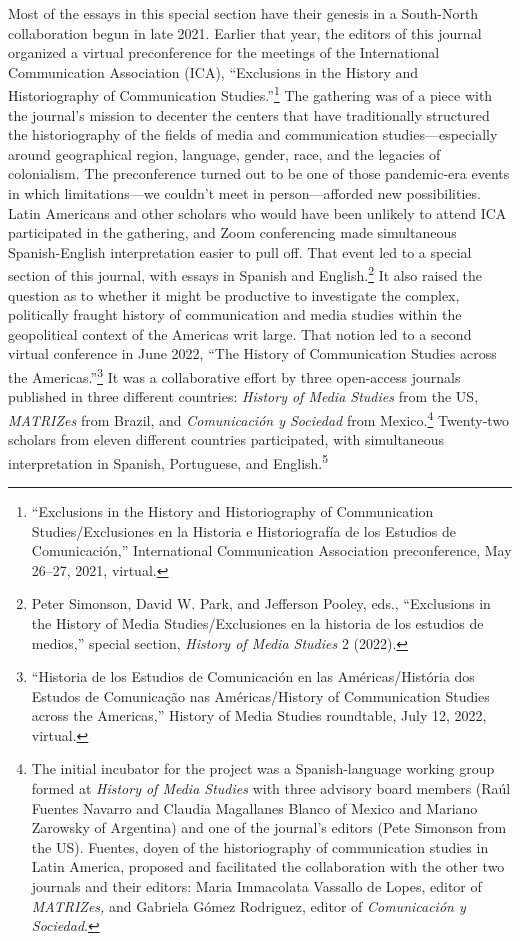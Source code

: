 \documentclass{tufte-handout}
\begin{document}
Most of the essays in this special section have their genesis in a South-North collaboration
begun in late 2021. Earlier that year, the editors of this journal organized a virtual preconference for the meetings of the International
Communication Association (ICA), ``Exclusions in the History and
Historiography of Communication Studies.''\footnote{``Exclusions in the
  History and Historiography of Communication Studies/Exclusiones en la
  Historia e Historiografía de los Estudios de Comunicación,''
  International Communication Association preconference, May 26--27,
  2021, virtual.} The gathering was of a piece with the journal's
mission to decenter the centers that have traditionally structured the
historiography of the fields of media and communication
studies---especially around geographical region, language, gender, race,
and the legacies of colonialism. The preconference turned out to be one
of those pandemic-era events in which limitations---we couldn't meet in
person---afforded new possibilities. Latin Americans and other scholars
who would have been unlikely to attend ICA participated in the
gathering, and Zoom conferencing made simultaneous Spanish-English
interpretation easier to pull off. That event led to a special section
of this journal, with essays in Spanish and English.\footnote{Peter
  Simonson, David W. Park, and Jefferson Pooley, eds., ``Exclusions in
  the History of Media Studies/Exclusiones en la historia de los
  estudios de medios,'' special section, \emph{History of Media Studies}
  2 (2022).} It also raised the question as to whether it might be
productive to investigate the complex, politically fraught history of
communication and media studies within the geopolitical context of the
Americas writ large. That notion led to a second virtual conference in
June 2022, ``The History of Communication Studies across the
Americas.''\footnote{``Historia de los Estudios de Comunicación en las
  Américas/História dos Estudos de Comunicação nas Américas/History of
  Communication Studies across the Americas,'' History of Media Studies
  roundtable, July 12, 2022, virtual.} It was a collaborative effort by
three open-access journals published in three different countries:
\emph{History of Media Studies} from the US, \emph{MATRIZes} from
Brazil, and \emph{Comunicación y Sociedad} from Mexico.\footnote{The
  initial incubator for the project was a Spanish-language working group
  formed at \emph{History of Media Studies} with three advisory board
  members (Raúl Fuentes Navarro and Claudia Magallanes Blanco of Mexico
  and Mariano Zarowsky of Argentina) and one of the journal's editors
  (Pete Simonson from the US). Fuentes, doyen of the historiography of
  communication studies in Latin America, proposed and facilitated the
  collaboration with the other two journals and their editors: Maria
  Immacolata Vassallo de Lopes, editor of \emph{MATRIZes,} and Gabriela
  Gómez Rodriguez, editor of \emph{Comunicación y Sociedad}.} Twenty-two
scholars from eleven different countries participated, with simultaneous
interpretation in Spanish, Portuguese, and English.\textsuperscript{5}
\end{document}

